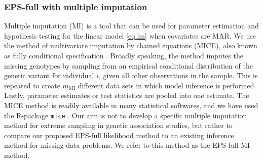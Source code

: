 \documentclass[10pt,a4paper]{article}
\begin{document}
\subsubsection{EPS-full with multiple imputation}
Multiple imputation (MI) is a tool that can be used for parameter estimation and hypothesis testing for the linear model \eqref{eq:lm} when covariates are MAR. We use the method of multivariate imputation by chained equations (MICE), also known as fully conditional specification \citep{buuren2007multiple}. Broadly speaking, the method imputes the missing genotypes by sampling from an empirical conditional distribution of the genetic variant for individual $i$, given all other observations in the sample. This is repeated to create $m_{\text{MI}}$ different data sets in which model inference is performed. Lastly, parameter estimates or test statistics are pooled into one estimate. The MICE method is readily available in many statistical softwares, and we have used the R-package \texttt{mice} \citep{buuren2011mice}. Our aim is not to develop a specific multiple imputation method for extreme sampling in genetic association studies, but rather to compare our proposed EPS-full likelihood method to an existing inference method for missing data problems. We refer to this method as the EPS-full MI method.
\end{document}
